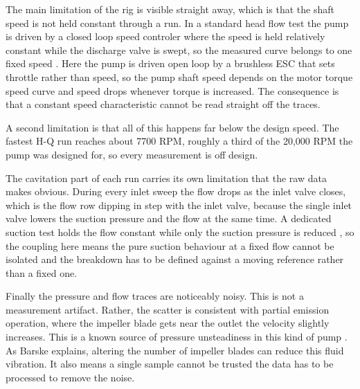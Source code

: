 The main limitation of the rig is visible straight away, which is that the shaft speed is not held constant through a run. In a standard head flow test the pump is driven by a closed loop speed controler where the speed is held relatively constant while the discharge valve is swept, so the measured curve belongs to one fixed speed \cite{gulichCentrifugalPumps2020, karassikPumpHandbook2008}. Here the pump is driven open loop by a brushless ESC that sets throttle rather than speed, so the pump shaft speed depends on the motor torque speed curve and speed drops whenever torque is increased. The consequence is that a constant speed characteristic cannot be read straight off the traces. %

A second limitation is that all of this happens far below the design speed. The fastest H-Q run reaches about 7700 RPM, roughly a third of the 20,000 RPM the pump was designed for, so every measurement is off design. %

The cavitation part of each run carries its own limitation that the raw data makes obvious. During every inlet sweep the flow drops as the inlet valve closes, which is the flow row dipping in step with the inlet valve, because the single inlet valve lowers the suction pressure and the flow at the same time. A dedicated suction test holds the flow constant while only the suction pressure is reduced \cite{gulichCentrifugalPumps2020, brennenHydrodynamicsPumps2011}, so the coupling here means the pure suction behaviour at a fixed flow cannot be isolated and the breakdown has to be defined against a moving reference rather than a fixed one.

Finally the pressure and flow traces are noticeably noisy. This is not a measurement artifact. Rather, the scatter is consistent with partial emission operation, where the impeller blade gets near the outlet the velocity slightly increases. This is a known source of pressure unsteadiness in this kind of pump \cite{barskeDesignOpenImpeller}. As Barske explains, altering the number of impeller blades can reduce this fluid vibration. It also means a single sample cannot be trusted the data has to be processed to remove the noise. %

